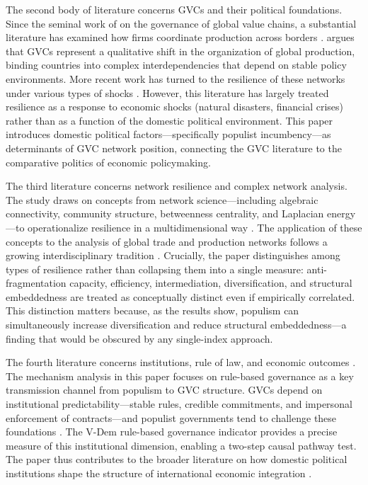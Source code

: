 \documentclass[12pt]{article}
\begin{document}
The second body of literature concerns GVCs and their political foundations. Since the seminal work of \citet{gereffi2005} on the governance of global value chains, a substantial literature has examined how firms coordinate production across borders \citep{antras2013, johnson2012, hummels2001, koopman2014, amador2016}. \citet{baldwin2016} argues that GVCs represent a qualitative shift in the organization of global production, binding countries into complex interdependencies that depend on stable policy environments. More recent work has turned to the resilience of these networks under various types of shocks \citep{miroudot2020, boehm2019, carvalho2016, antras2020}. However, this literature has largely treated resilience as a response to economic shocks (natural disasters, financial crises) rather than as a function of the domestic political environment. This paper introduces domestic political factors---specifically populist incumbency---as determinants of GVC network position, connecting the GVC literature to the comparative politics of economic policymaking.

The third literature concerns network resilience and complex network analysis. The study draws on concepts from network science---including algebraic connectivity, community structure, betweenness centrality, and Laplacian energy---to operationalize resilience in a multidimensional way \citep{albert2002, newman2010, buldyrev2010, gao2016, acemoglu2012}. The application of these concepts to the analysis of global trade and production networks follows a growing interdisciplinary tradition \citep{carvalho2014, digiovanni2018, watts1998, newmangirvan2004}. Crucially, the paper distinguishes among types of resilience rather than collapsing them into a single measure: anti-fragmentation capacity, efficiency, intermediation, diversification, and structural embeddedness are treated as conceptually distinct even if empirically correlated. This distinction matters because, as the results show, populism can simultaneously increase diversification and reduce structural embeddedness---a finding that would be obscured by any single-index approach.

The fourth literature concerns institutions, rule of law, and economic outcomes \citep{north1990, acemoglu2001, kaufmann2010, hallsoskice2001}. The mechanism analysis in this paper focuses on rule-based governance as a key transmission channel from populism to GVC structure. GVCs depend on institutional predictability---stable rules, credible commitments, and impersonal enforcement of contracts---and populist governments tend to challenge these foundations \citep{funke2016, bermeo2016, ruggie1982}. The V-Dem rule-based governance indicator provides a precise measure of this institutional dimension, enabling a two-step causal pathway test. The paper thus contributes to the broader literature on how domestic political institutions shape the structure of international economic integration \citep{milner1997, buthemilner2008, mansfield2012, frieden1991}.
\end{document}
